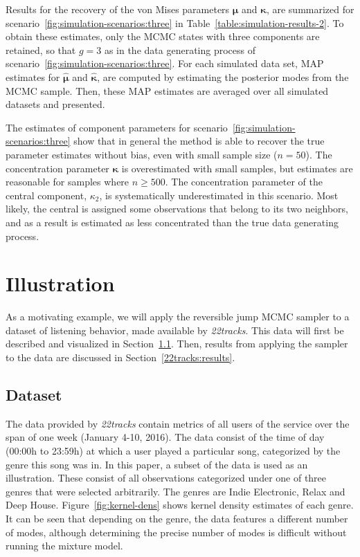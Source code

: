 Results for the recovery of the von Mises parameters $\bm \mu$ and $\bm \kappa$, are summarized for scenario~\ref{fig:simulation-scenarios:three} in Table~\ref{table:simulation-results-2}. To obtain these estimates, only the MCMC states with three components are retained, so that $g=3$ as in the data generating process of scenario~\ref{fig:simulation-scenarios:three}. For each simulated data set, MAP estimates for $\hat{\bm\mu}$ and $\hat{\bm\kappa}$, are computed by estimating the posterior modes from the MCMC sample. Then, these MAP estimates are averaged over all simulated datasets and presented.

The estimates of component parameters for scenario~\ref{fig:simulation-scenarios:three} show that in general the method is able to recover the true parameter estimates without bias, even with small sample size ($n=50$). The concentration parameter $\bm \kappa$ is overestimated with small samples, but estimates are reasonable for samples where $n \geq 500$.  The concentration parameter of the central component, $\kappa_2$, is systematically underestimated in this scenario. Most likely, the central is assigned some observations that belong to its two neighbors, and as a result is estimated as less concentrated than the true data generating process. 

\section{Illustration}
\label{22tracks}
As a motivating example, we will apply the reversible jump MCMC sampler to a dataset of listening behavior, made available by \textit{22tracks}. This data  will first be described and visualized in Section~\ref{22tracks:dataset}. Then, results from applying the sampler to the data are discussed in Section~\ref{22tracks:results}.



\subsection{Dataset}
\label{22tracks:dataset}

The data provided by \textit{22tracks} contain metrics of all users of the service over the span of one week (January 4-10, 2016). The data consist of the time of day (00:00h to 23:59h) at which a user played a particular song, categorized by the genre this song was in. In this paper, a subset of the data is used as an illustration. These consist of all observations categorized under one of three genres that were selected arbitrarily. The genres are Indie Electronic, Relax and Deep House. Figure~\ref{fig:kernel-dens} shows kernel density estimates of each genre. It can be seen that  depending on the genre, the data features a different number of modes, although determining the precise number of modes is difficult without running the mixture model.


